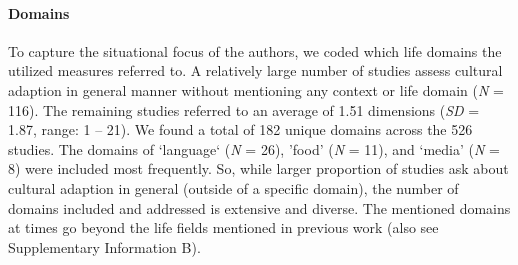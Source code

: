 \paragraph{Domains}

To capture the situational focus of the authors, we coded which life
domains the utilized measures referred to. A relatively large number of
studies assess cultural adaption in general manner without mentioning
any context or life domain (\textit{N} = 116). The remaining studies
referred to an average of 1.51 dimensions (\textit{SD} = 1.87, range: 1
-- 21). We found a total of 182 unique domains across the 526 studies.
The domains of `language` (\textit{N} = 26), 'food' (\textit{N} = 11),
and `media' (\textit{N} = 8) were included most frequently. So, while
larger proportion of studies ask about cultural adaption in general
(outside of a specific domain), the number of domains included and
addressed is extensive and diverse. The mentioned domains at times go
beyond the life fields mentioned in previous work (also see
Supplementary Information B).
